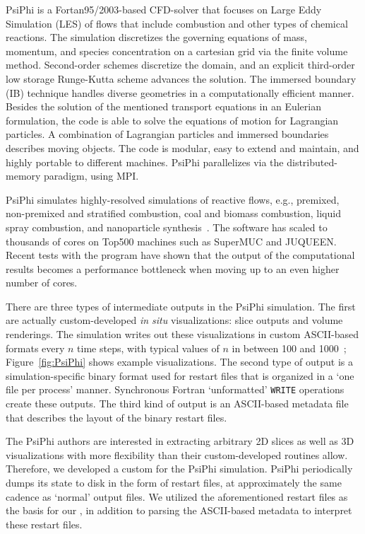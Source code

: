 PsiPhi is a Fortan95/2003-based CFD-solver that focuses on Large Eddy
Simulation (LES) of flows that include combustion and other types of
chemical reactions.  The simulation discretizes the governing equations
of mass, momentum, and species concentration on a cartesian grid via
the finite volume method.  Second-order schemes discretize the domain,
and an explicit third-order low storage Runge-Kutta scheme advances
the solution.  The immersed boundary (IB) technique handles diverse
geometries in a computationally efficient manner.  Besides the solution
of the mentioned transport equations in an Eulerian formulation, the
code is able to solve the equations of motion for Lagrangian particles.
A combination of Lagrangian particles and immersed boundaries describes
moving objects.  The code is modular, easy to extend and maintain, and
highly portable to different machines.  PsiPhi parallelizes via the
distributed-memory paradigm, using MPI.


PsiPhi simulates highly-resolved simulations of reactive flows, e.g.,
premixed, non-premixed and stratified combustion, coal and biomass
combustion, liquid spray combustion, and nanoparticle
synthesis~\cite{Pettit2011PCI, Ma2013CTM, CavalloMarincola2013PCI}.
The software has scaled to thousands of cores on Top500 machines such
as SuperMUC and JUQUEEN.  Recent tests with the program have shown
that the output of the computational results becomes a performance
bottleneck when moving up to an even higher number of cores.

There are three types of intermediate outputs in the PsiPhi simulation.
The first
are actually custom-developed \textit{in situ} visualizations: slice
outputs and volume renderings.  The simulation writes out these
visualizations in custom ASCII-based formats every $n$ time steps, with
typical values of $n$ in
between 100 and 1000~\cite{Proch2014CNF};
Figure~\ref{fig:PsiPhi} shows example visualizations.  The second type
of output is a simulation-specific binary format used for restart files
that is organized in a `one file per process' manner.  Synchronous
Fortran `unformatted'
\texttt{WRITE} operations create these outputs.  The third kind of
output is an ASCII-based metadata file that describes the layout of the
binary restart files.

The PsiPhi authors are interested in extracting arbitrary 2D slices
as well as 3D visualizations with more flexibility than their
custom-developed routines allow.
Therefore, we developed a custom \freeprocessor{} for the PsiPhi
simulation.  PsiPhi periodically dumps its state to disk in the form
of restart files, at approximately the same cadence as `normal' output
files.  We utilized the aforementioned restart files as the basis for our
\freeprocessor{}, in addition to parsing the ASCII-based metadata to interpret
these restart files.

